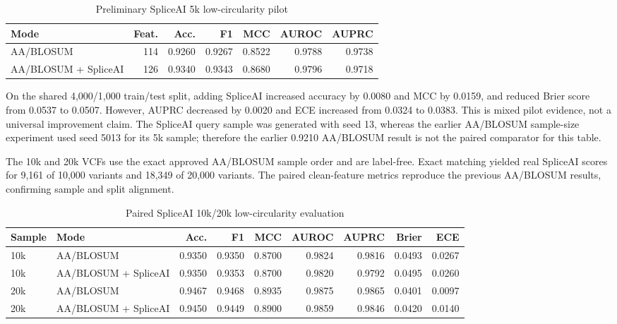 \documentclass[conference]{IEEEtran}
\begin{document}
\begin{table}[t]
\centering
\scriptsize
\caption{Preliminary SpliceAI 5k low-circularity pilot}
\label{tab:spliceai-5k-pilot}
\begin{tabular}{lrrrrrr}
\toprule
Mode & Feat. & Acc. & F1 & MCC & AUROC & AUPRC \\
\midrule
AA/BLOSUM & 114 & 0.9260 & 0.9267 & 0.8522 & 0.9788 & 0.9738 \\
AA/BLOSUM + SpliceAI & 126 & 0.9340 & 0.9343 & 0.8680 & 0.9796 & 0.9718 \\
\bottomrule
\end{tabular}
\end{table}

On the shared 4,000/1,000 train/test split, adding SpliceAI increased accuracy by 0.0080 and MCC by 0.0159, and reduced Brier score from 0.0537 to 0.0507. However, AUPRC decreased by 0.0020 and ECE increased from 0.0324 to 0.0383. This is mixed pilot evidence, not a universal improvement claim. The SpliceAI query sample was generated with seed 13, whereas the earlier AA/BLOSUM sample-size experiment used seed 5013 for its 5k sample; therefore the earlier 0.9210 AA/BLOSUM result is not the paired comparator for this table.

The 10k and 20k VCFs use the exact approved AA/BLOSUM sample order and are label-free. Exact matching yielded real SpliceAI scores for 9,161 of 10,000 variants and 18,349 of 20,000 variants. The paired clean-feature metrics reproduce the previous AA/BLOSUM results, confirming sample and split alignment.

\begin{table}[t]
\centering
\scriptsize
\caption{Paired SpliceAI 10k/20k low-circularity evaluation}
\label{tab:spliceai-10k-20k}
\begin{tabular}{llrrrrrrr}
\toprule
Sample & Mode & Acc. & F1 & MCC & AUROC & AUPRC & Brier & ECE \\
\midrule
10k & AA/BLOSUM & 0.9350 & 0.9350 & 0.8700 & 0.9824 & 0.9816 & 0.0493 & 0.0267 \\
10k & AA/BLOSUM + SpliceAI & 0.9350 & 0.9353 & 0.8700 & 0.9820 & 0.9792 & 0.0495 & 0.0260 \\
20k & AA/BLOSUM & 0.9467 & 0.9468 & 0.8935 & 0.9875 & 0.9865 & 0.0401 & 0.0097 \\
20k & AA/BLOSUM + SpliceAI & 0.9450 & 0.9449 & 0.8900 & 0.9859 & 0.9846 & 0.0420 & 0.0140 \\
\bottomrule
\end{tabular}
\end{table}
\end{document}
